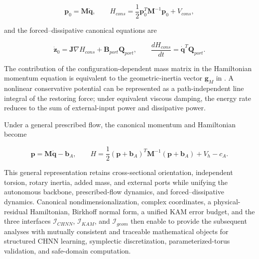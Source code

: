 \begin{equation}
\label{eq:hamiltonian-3-105}
\boxed{\mathbf{p}_{0} = \mathbf{M}\dot{\mathbf{q}},\quad\quad H_{cons} = \frac{1}{2}\mathbf{p}_{0}^{T}\mathbf{M}^{- 1}\mathbf{p}_{0} + V_{cons},}
\end{equation}

and the forced--dissipative canonical equations are

\begin{equation}
\label{eq:hamiltonian-3-106}
\boxed{{\dot{\mathbf{z}}}_{0} = \mathbf{J}\nabla H_{cons} + \mathbf{B}_{port}\mathbf{Q}_{port},\quad\quad\frac{dH_{cons}}{dt} = {\dot{\mathbf{q}}}^{T}\mathbf{Q}_{port}.}
\end{equation}

The contribution of the configuration-dependent mass matrix in the Hamiltonian momentum equation is equivalent to the geometric-inertia vector \(\mathbf{g}_{M}\) in . A nonlinear conservative potential can be represented as a path-independent line integral of the restoring force; under equivalent viscous damping, the energy rate reduces to the sum of external-input power and dissipative power.

Under a general prescribed flow, the canonical momentum and Hamiltonian become

\begin{equation}
\label{eq:hamiltonian-3-107}
\boxed{\mathbf{p} = \mathbf{M}\dot{\mathbf{q}} - \mathbf{b}_{A},\quad\quad H = \frac{1}{2}\left( \mathbf{p} + \mathbf{b}_{A} \right)^{T}\mathbf{M}^{- 1}\left( \mathbf{p} + \mathbf{b}_{A} \right) + V_{h} - c_{A}.}
\end{equation}

This general representation retains cross-sectional orientation, independent torsion, rotary inertia, added mass, and external ports while unifying the autonomous backbone, prescribed-flow dynamics, and forced--dissipative dynamics. Canonical nondimensionalization, complex coordinates, a physical-residual Hamiltonian, Birkhoff normal form, a unified KAM error budget, and the three interfaces \(\mathcal{I}_{CHNN}\), \(\mathcal{I}_{KAM}\), and \(\mathcal{I}_{geom}\) then enable  to provide the subsequent analyses with mutually consistent and traceable mathematical objects for structured CHNN learning, symplectic discretization, parameterized-torus validation, and safe-domain computation.

